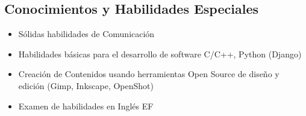 \documentclass[overlapped,line,final]{../../templates/MichaelDeCorteCV/lib/res}
\begin{document}
\begin{resume}
\section{\sc Conocimientos y Habilidades Especiales}
\vspace{0.5cm}
\begin{itemize}
	\item Sólidas habilidades de Comunicación
	\item Habilidades básicas para el desarrollo de software C/C++, Python (Django)
 	\item Creación de Contenidos usando herramientas Open Source de diseño y edición (Gimp, Inkscape, OpenShot)
	\item Examen de habilidades en Inglés EF \href{https://raw.githubusercontent.com/dtorot/NemqCV/profile-engineer/latex/docs/efTest2021.pdf}{}
\end{itemize}


\end{resume}
\end{document}
